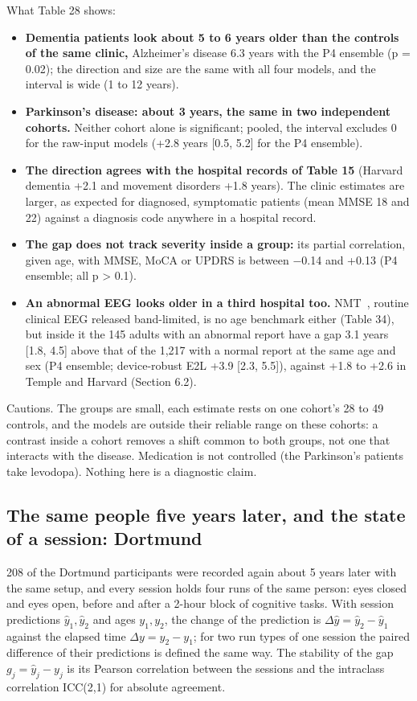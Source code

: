 \documentclass[11pt,a4paper]{article}
\begin{document}
What Table 28 shows:

\begin{itemize}
\item \textbf{Dementia patients look about 5 to 6 years older than the controls of the same clinic,} Alzheimer's disease 6.3 years with the P4 ensemble (p = 0.02); the direction and size are the same with all four models, and the interval is wide (1 to 12 years).
\item \textbf{Parkinson's disease: about 3 years, the same in two independent cohorts.} Neither cohort alone is significant; pooled, the interval excludes 0 for the raw-input models (+2.8 years [0.5, 5.2] for the P4 ensemble).
\item \textbf{The direction agrees with the hospital records of Table 15} (Harvard dementia +2.1 and movement disorders +1.8 years). The clinic estimates are larger, as expected for diagnosed, symptomatic patients (mean MMSE 18 and 22) against a diagnosis code anywhere in a hospital record.
\item \textbf{The gap does not track severity inside a group:} its partial correlation, given age, with MMSE, MoCA or UPDRS is between $-$0.14 and +0.13 (P4 ensemble; all p > 0.1).
\item \textbf{An abnormal EEG looks older in a third hospital too.} NMT~\citep{khan2022nmt}, routine clinical EEG released band-limited, is no age benchmark either (Table 34), but inside it the 145 adults with an abnormal report have a gap 3.1 years [1.8, 4.5] above that of the 1,217 with a normal report at the same age and sex (P4 ensemble; device-robust E2L +3.9 [2.3, 5.5]), against +1.8 to +2.6 in Temple and Harvard (Section 6.2).
\end{itemize}

Cautions. The groups are small, each estimate rests on one cohort's 28 to 49 controls, and the models are outside their reliable range on these cohorts: a contrast inside a cohort removes a shift common to both groups, not one that interacts with the disease. Medication is not controlled (the Parkinson's patients take levodopa). Nothing here is a diagnostic claim.

\subsection{The same people five years later, and the state of a session: Dortmund}

208 of the Dortmund participants were recorded again about 5 years later with the same setup, and every session holds four runs of the same person: eyes closed and eyes open, before and after a 2-hour block of cognitive tasks. With session predictions $\hat y_1, \hat y_2$ and ages $y_1, y_2$, the change of the prediction is $\Delta \hat y = \hat y_2 - \hat y_1$ against the elapsed time $\Delta y = y_2 - y_1$; for two run types of one session the paired difference of their predictions is defined the same way. The stability of the gap $g_j = \hat y_j - y_j$ is its Pearson correlation between the sessions and the intraclass correlation ICC(2,1) for absolute agreement.
\end{document}
